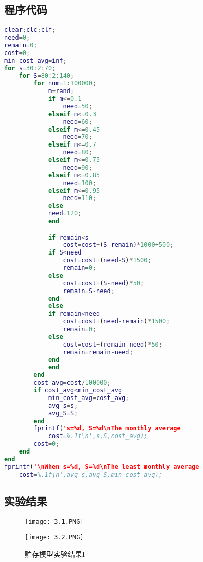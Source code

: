 \documentclass[UTF8]{ctexart}
\begin{document}
    \subsection{程序代码}
\begin{lstlisting}[language=matlab]
clear;clc;clf;
need=0;
remain=0;
cost=0;
min_cost_avg=inf;
for s=30:2:70;
    for S=80:2:140;
        for num=1:100000;
            m=rand;
            if m<=0.1
                need=50;
            elseif m<=0.3
                need=60;
            elseif m<=0.45
                need=70;
            elseif m<=0.7
                need=80;
            elseif m<=0.75
                need=90;
            elseif m<=0.85
                need=100;
            elseif m<=0.95
                need=110;
            else
            need=120;
            end

            if remain<s
                cost=cost+(S-remain)*1000+500;
            if S<need
                cost=cost+(need-S)*1500;
                remain=0;
            else
                cost=cost+(S-need)*50;
                remain=S-need;
            end
            else
            if remain<need
                cost=cost+(need-remain)*1500;
                remain=0;
            else
                cost=cost+(remain-need)*50;
                remain=remain-need;
            end
            end
        end
        cost_avg=cost/100000;
        if cost_avg<min_cost_avg
            min_cost_avg=cost_avg;
            avg_s=s;
            avg_S=S;
        end
        fprintf('s=%d, S=%d\nThe monthly average 
        	cost=%.1f\n',s,S,cost_avg);
        cost=0;
    end
end
fprintf('\nWhen s=%d, S=%d\nThe least monthly average 
	cost=%.1f\n',avg_s,avg_S,min_cost_avg);
\end{lstlisting}

    \subsection{实验结果}
	\begin{figure}
	\centering
	\begin{minipage}[c]{0.5\textwidth}
	\centering
	\texttt{[image: 3.1.PNG]}
	\end{minipage}%
	\begin{minipage}[c]{0.5\textwidth}
	\centering
	\texttt{[image: 3.2.PNG]}
	\end{minipage}
	\caption{贮存模型实验结果I}
	\end{figure}
\end{document}
